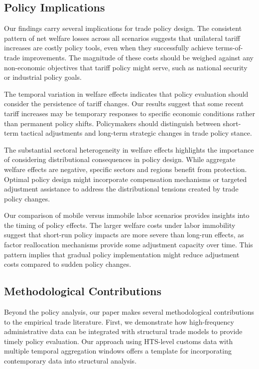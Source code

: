 \subsection{Policy Implications}

Our findings carry several implications for trade policy design. The consistent pattern of net welfare losses across all scenarios suggests that unilateral tariff increases are costly policy tools, even when they successfully achieve terms-of-trade improvements. The magnitude of these costs should be weighed against any non-economic objectives that tariff policy might serve, such as national security or industrial policy goals.

The temporal variation in welfare effects indicates that policy evaluation should consider the persistence of tariff changes. Our results suggest that some recent tariff increases may be temporary responses to specific economic conditions rather than permanent policy shifts. Policymakers should distinguish between short-term tactical adjustments and long-term strategic changes in trade policy stance.

The substantial sectoral heterogeneity in welfare effects highlights the importance of considering distributional consequences in policy design. While aggregate welfare effects are negative, specific sectors and regions benefit from protection. Optimal policy design might incorporate compensation mechanisms or targeted adjustment assistance to address the distributional tensions created by trade policy changes.

Our comparison of mobile versus immobile labor scenarios provides insights into the timing of policy effects. The larger welfare costs under labor immobility suggest that short-run policy impacts are more severe than long-run effects, as factor reallocation mechanisms provide some adjustment capacity over time. This pattern implies that gradual policy implementation might reduce adjustment costs compared to sudden policy changes.

\subsection{Methodological Contributions}

Beyond the policy analysis, our paper makes several methodological contributions to the empirical trade literature. First, we demonstrate how high-frequency administrative data can be integrated with structural trade models to provide timely policy evaluation. Our approach using HTS-level customs data with multiple temporal aggregation windows offers a template for incorporating contemporary data into structural analysis.

